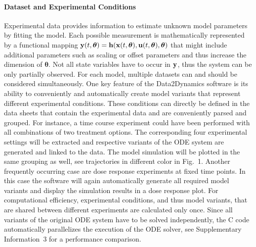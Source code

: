 \documentclass{bioinfo}
\begin{document}
\paragraph{Dataset and Experimental Conditions}
Experimental data provides information to estimate unknown model parameters by fitting the model. Each possible measurement is mathematically represented by a functional mapping
${\bf y}(t,{\boldsymbol \theta}) = {\bf h}({\bf x}(t,{\boldsymbol \theta}),{\bf u}(t,{\boldsymbol \theta}),{\boldsymbol \theta})$
that might include additional parameters such as scaling or offset parameters and thus increase the dimension of ${\boldsymbol \theta}$. Not all state variables have to occur in ${\bf y}$, thus the system can be only partially observed. For each model, multiple datasets can and should be considered simultaneously. One key feature of the Data2Dynamics software is its ability to conveniently and automatically create model variants that represent different experimental conditions. These conditions can directly be defined in the data sheets that contain the experimental data and are conveniently parsed and grouped. For instance, a time course experiment could have been performed with all combinations of two treatment options. The corresponding four experimental settings will be extracted and respective variants of the ODE system are generated and linked to the data. The model simulation will be plotted in the same grouping as well, see trajectories in different color in Fig.~1. Another frequently occurring case are dose response experiments at fixed time points. In this case the software will again automatically generate all required model variants and display the simulation results in a dose response plot. For computational efficiency, experimental conditions, and thus model variants, that are shared between different experiments are calculated only once. Since all variants of the original ODE system have to be solved independently, the C code automatically parallelizes the execution of the ODE solver, see Supplementary Information~3 for a performance comparison. 
\end{document}
